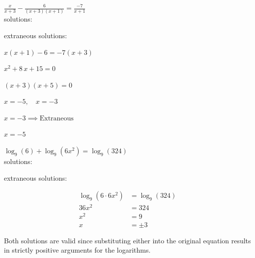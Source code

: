 \documentclass[11pt]{exam}
\begin{document}
\begin{questions}
\label{exact-startocg}
\newpage


\question[7] \(\displaystyle{ \displaystyle \frac{x}{x + 3} - \frac{6}{(x + 3)(x + 1)} = \frac{-7}{x + 1} }\)\\
    
         solutions: \fillin[][2in]\\\vspace{12pt}
        
         extraneous solutions: \fillin[][2in]\\
\begin{solution}
\(x(x + 1) - 6 = -7(x + 3)\) 

 \(x^{2} + 8 \, x + 15 = 0\) 

 \((x + 3)(x + 5) = 0\) 

 \(x = -5, \quad x = -3\) 

 \(x = -3 \implies \text{Extraneous}\) 

 \(\boxed{x = -5}\)
\end{solution}

\newpage


\question[6] \(\displaystyle{ \log_{9}(6) + \log_{9}(6x^2) = \log_{9}(324) }\)\\
    
         solutions: \fillin[][2in]\\\vspace{12pt}
        
         extraneous solutions: \fillin[][2in]\\
\begin{solution}
\[\begin{aligned} \log_{9}(6 \cdot 6x^2) &= \log_{9}(324) \\ 36x^2 &= 324 \\ x^2 &= 9 \\ x &= \pm 3 \end{aligned}\]

 Both solutions are valid since substituting either into the original equation results in strictly positive arguments for the logarithms. 


\end{solution}
\end{questions}
\end{document}
